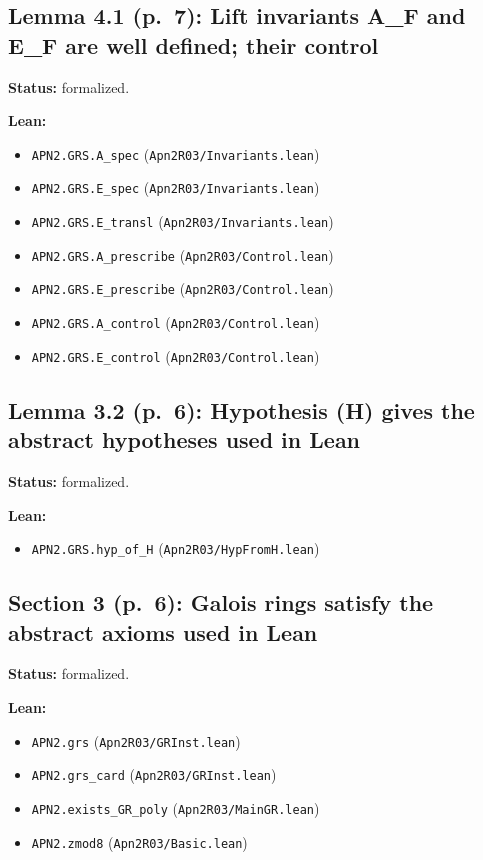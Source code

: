 \documentclass[11pt]{article}
\begin{document}
\subsection*{Lemma 4.1 (p.~7): Lift invariants A\_F and E\_F are well defined; their control}
\textbf{Status:} formalized.\par
\textbf{Lean:}\begin{itemize}\setlength\itemsep{0pt}
\item \texttt{APN2.GRS.A\_spec} \hfill (\texttt{Apn2R03/Invariants.lean})
\item \texttt{APN2.GRS.E\_spec} \hfill (\texttt{Apn2R03/Invariants.lean})
\item \texttt{APN2.GRS.E\_transl} \hfill (\texttt{Apn2R03/Invariants.lean})
\item \texttt{APN2.GRS.A\_prescribe} \hfill (\texttt{Apn2R03/Control.lean})
\item \texttt{APN2.GRS.E\_prescribe} \hfill (\texttt{Apn2R03/Control.lean})
\item \texttt{APN2.GRS.A\_control} \hfill (\texttt{Apn2R03/Control.lean})
\item \texttt{APN2.GRS.E\_control} \hfill (\texttt{Apn2R03/Control.lean})
\end{itemize}
\subsection*{Lemma 3.2 (p.~6): Hypothesis (H) gives the abstract hypotheses used in Lean}
\textbf{Status:} formalized.\par
\textbf{Lean:}\begin{itemize}\setlength\itemsep{0pt}
\item \texttt{APN2.GRS.hyp\_of\_H} \hfill (\texttt{Apn2R03/HypFromH.lean})
\end{itemize}
\subsection*{Section 3 (p.~6): Galois rings satisfy the abstract axioms used in Lean}
\textbf{Status:} formalized.\par
\textbf{Lean:}\begin{itemize}\setlength\itemsep{0pt}
\item \texttt{APN2.grs} \hfill (\texttt{Apn2R03/GRInst.lean})
\item \texttt{APN2.grs\_card} \hfill (\texttt{Apn2R03/GRInst.lean})
\item \texttt{APN2.exists\_GR\_poly} \hfill (\texttt{Apn2R03/MainGR.lean})
\item \texttt{APN2.zmod8} \hfill (\texttt{Apn2R03/Basic.lean})
\end{itemize}
\end{document}
